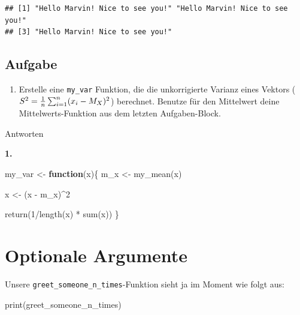 \documentclass[
]{book}
\newenvironment{Shaded}{\begin{snugshade}}{\end{snugshade}}
\newcommand{\ControlFlowTok}[1]{\textcolor[rgb]{0.13,0.29,0.53}{\textbf{#1}}}
\newcommand{\DecValTok}[1]{\textcolor[rgb]{0.00,0.00,0.81}{#1}}
\newcommand{\FunctionTok}[1]{\textcolor[rgb]{0.00,0.00,0.00}{#1}}
\newcommand{\NormalTok}[1]{#1}
\newcommand{\OtherTok}[1]{\textcolor[rgb]{0.56,0.35,0.01}{#1}}
\newcommand{\SpecialCharTok}[1]{\textcolor[rgb]{0.00,0.00,0.00}{#1}}
\providecommand{\tightlist}{%
  \setlength{\itemsep}{0pt}\setlength{\parskip}{0pt}}
\begin{document}
\begin{verbatim}
## [1] "Hello Marvin! Nice to see you!" "Hello Marvin! Nice to see you!"
## [3] "Hello Marvin! Nice to see you!"
\end{verbatim}

\hypertarget{aufgabe-1}{%
\subsection{Aufgabe}\label{aufgabe-1}}

\begin{enumerate}
\def\labelenumi{\arabic{enumi}.}
\tightlist
\item
  Erstelle eine \texttt{my\_var} Funktion, die die unkorrigierte Varianz eines Vektors (\(S^2 = {1\over{n}} \sum_{i=1}^n(x_i -M_X)^2\)) berechnet. Benutze für den Mittelwert deine Mittelwerts-Funktion aus dem letzten Aufgaben-Block.
\end{enumerate}

Antworten

\textbf{1.}

\begin{Shaded}
\begin{Highlighting}[]
\NormalTok{my\_var }\OtherTok{\textless{}{-}} \ControlFlowTok{function}\NormalTok{(x)\{}
\NormalTok{  m\_x }\OtherTok{\textless{}{-}} \FunctionTok{my\_mean}\NormalTok{(x)}
  
\NormalTok{  x }\OtherTok{\textless{}{-}}\NormalTok{ (x }\SpecialCharTok{{-}}\NormalTok{ m\_x)}\SpecialCharTok{\^{}}\DecValTok{2}
  
  \FunctionTok{return}\NormalTok{(}\DecValTok{1}\SpecialCharTok{/}\FunctionTok{length}\NormalTok{(x) }\SpecialCharTok{*} \FunctionTok{sum}\NormalTok{(x))}
\NormalTok{\}}
\end{Highlighting}
\end{Shaded}

\hypertarget{optionale-argumente}{%
\section{Optionale Argumente}\label{optionale-argumente}}

Unsere \texttt{greet\_someone\_n\_times}-Funktion sieht ja im Moment wie folgt aus:

\begin{Shaded}
\begin{Highlighting}[]
\FunctionTok{print}\NormalTok{(greet\_someone\_n\_times)}
\end{Highlighting}
\end{Shaded}
\end{document}
